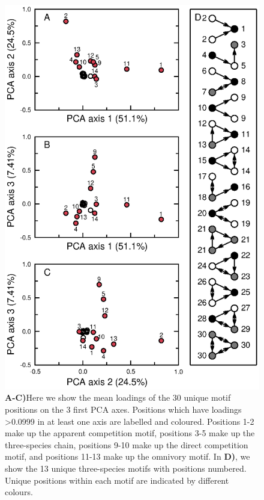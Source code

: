 \documentclass[12pt]{article}
\begin{document}
	\begin{figure}[h!]
		\caption{\textbf{A-C)}Here we show the mean loadings of the 30 unique motif positions on the 3 first PCA axes. Positions which have loadings \textgreater0.0999 in at least one axis are labelled and coloured. Positions 1-2 make up the apparent competition motif, positions 3-5 make up the three-species chain, positions 9-10 make up the direct competition motif, and positions 11-13 make up the omnivory motif. 
		In \textbf{D)}, we show the 13 unique three-species motifs with positions numbered. Unique positions within each motif are indicated by different colours.}
		\label{PCA_plots}
		\includegraphics[height=.75\textheight]{figures/roles/roleplot_paper_points.eps}

	\end{figure}
			
\end{document}
